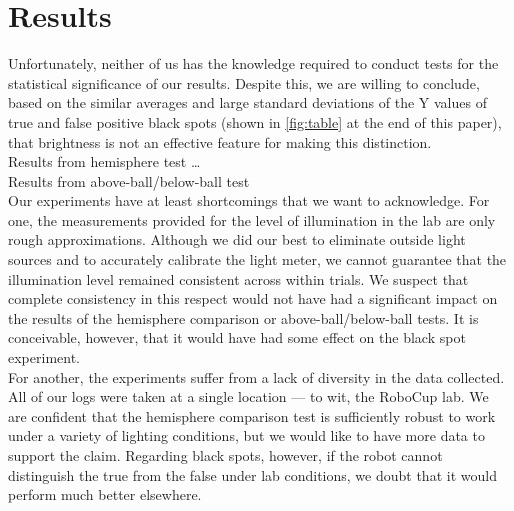 \documentclass[11pt, twocolumn]{article}
\begin{document}
\section{Results}
Unfortunately, neither of us has the knowledge required to conduct tests for the statistical significance of our results. Despite this, we are willing to conclude, based on the similar averages and large standard deviations of the Y values of true and false positive black spots (shown in \ref{fig:table} at the end of this paper), that brightness is not an effective feature for making this distinction.\\
\indent Results from hemisphere test \ldots \\
\indent Results from above-ball/below-ball test \\
\indent Our experiments have at least shortcomings that we want to acknowledge. For one, the measurements provided for the level of illumination in the lab are only rough approximations. Although we did our best to eliminate outside light sources and to accurately calibrate the light meter, we cannot guarantee that the illumination level remained consistent across within trials. We suspect that complete consistency in this respect would not have had a significant impact on the results of the hemisphere comparison or above-ball/below-ball tests. It is conceivable, however, that it would have had some effect on the black spot experiment. \\
\indent For another, the experiments suffer from a lack of diversity in the data collected. All of our logs were taken at a single location --- to wit, the RoboCup lab. We are confident that the hemisphere comparison test is sufficiently robust to work under a variety of lighting conditions, but we would like to have more data to support the claim. Regarding black spots, however, if the robot cannot distinguish the true from the false under lab conditions, we doubt that it would perform much better elsewhere.
\end{document}
